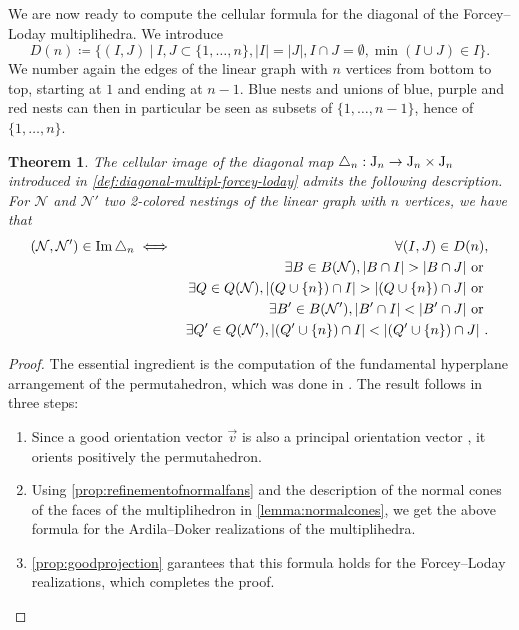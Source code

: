 \documentclass[10pt]{amsart}
\newtheorem{theorem}{Theorem}
\theoremstyle{remark}
\begin{document}
We are now ready to compute the cellular formula for the diagonal of the Forcey--Loday multiplihedra. We introduce \[ D(n)\coloneqq \{(I,J) \ | \ I,J\subset\{1,\ldots,n\}, |I|=|J|, I\cap J=\emptyset, \min(I\cup J)\in I \}. \]
We number again the edges of the linear graph with $n$ vertices from bottom to top, starting at $1$ and ending at $n-1$. 
Blue nests and unions of blue, purple and red nests can then in particular be seen as subsets of $\{1,\ldots,n-1\}$, hence of $\{1,\ldots,n\}$.

\begin{samepage}
\begin{theorem}
\label{thm:formuladiagonal}
The cellular image of the diagonal map $\triangle_n : \mathrm{J}_n \to \mathrm{J}_n \times \mathrm{J}_n$ introduced in \cref{def:diagonal-multipl-forcey-loday} admits the following description.
For $\mathcal{N}$ and $\mathcal{N}'$ two 2-colored nestings of the linear graph with $n$ vertices, we have that
\begin{eqnarray*}
  (\mathcal{N},\mathcal{N}') \in \Ima\triangle_n 
  & \iff & \forall (I,J) \in D(n), \\
  && \exists B \in B(\mathcal{N}), |B\cap I|>|B\cap J| \text{ or }  \\
  && \exists Q \in Q(\mathcal{N}), |(Q\cup \{n\}) \cap I|>| (Q\cup \{n\}) \cap J| \text{ or }  \\
  && \exists B' \in B(\mathcal{N}'), |B'\cap I|<|B'\cap J| \text{ or } \nonumber \\
  && \exists Q' \in Q(\mathcal{N}'), |(Q'\cup \{n\}) \cap I|<| (Q'\cup \{n\}) \cap J| \ .
\end{eqnarray*}
\end{theorem}
\end{samepage}

\begin{proof} 
The essential ingredient is the computation of the fundamental hyperplane arrangement of the permutahedron, which was done in \cite[Section 3.1]{LA21}. The result follows in three steps:
\begin{enumerate}[leftmargin=*]
\item Since a good orientation vector $\vec v$ is also a principal orientation vector \cite[Definition 3.15]{LA21}, it orients positively the permutahedron. 
\item Using \cref{prop:refinementofnormalfans} and the description of the normal cones of the faces of the multiplihedron in \cref{lemma:normalcones}, we get the above formula for the Ardila--Doker realizations of the multiplihedra. 
\item \cref{prop:goodprojection} garantees that this formula holds for the Forcey--Loday realizations, which completes the proof.
\end{enumerate}
\end{proof}
\end{document}
